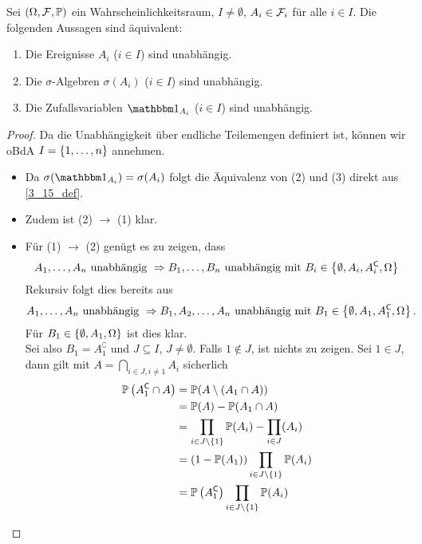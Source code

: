 \begin{lemma}
	\label{3_16_lemma}
	Sei $(\Omega,\mathcal{F},\mathbb{P})$ ein Wahrscheinlichkeitsraum, $I \neq \emptyset$, $A_i \in \mathcal{F}_i$ für alle $i \in I$. 
	Die folgenden Aussagen sind äquivalent:
	\begin{enumerate}[nolistsep]
		\item Die Ereignisse $A_i$ ($i \in I$) sind unabhängig. 
		\item Die $\sigma$-Algebren $\sigma(A_i)$ ($i \in I$) sind unabhängig.
		\item Die Zufallsvariablen $\one_{A_i}$ ($i \in I$) sind unabhängig.
	\end{enumerate}
\end{lemma}
\begin{proof}
	Da die Unabhängigkeit über endliche Teilemengen definiert ist, können wir oBdA $I = \left\{ 1, \dots, n \right\}$ annehmen. 
	\begin{itemize}[leftmargin=*, nolistsep]
		\item Da $\sigma(\one_{A_i}) = \sigma(A_i)$ folgt die Äquivalenz von (2) und (3) direkt aus \cref{3_15_def}.
		\item Zudem ist (2) $\to$ (1) klar.
		\item Für (1) $\to$ (2) genügt es zu zeigen, dass
		\begin{equation*}
			A_1, \dots, A_n \text{ unabhängig } \Rightarrow B_1, \dots, B_n \text{ unabhängig mit } B_i \in \left\{ \emptyset, A_i, A_i^{\mathsf{C}}, \Omega \right\}
		\end{equation*}
		Rekursiv folgt dies bereits aus
		\begin{equation*}
			A_1,\dots, A_n \text{ unabhängig } \Rightarrow B_1, A_2, \dots, A_n \text{ unabhängig mit } B_1 \in \left\{ \emptyset, A_1, A_1^{\mathsf{C}}, \Omega \right\}.
		\end{equation*}
		Für $B_1 \in \left\{ \emptyset, A_1, \Omega \right\}$ ist dies klar.\\
		Sei also $B_1 = A_1^\complement$ und $J \subseteq I$, $J \neq \emptyset$. Falls $1 \notin J$, ist nichts zu zeigen. Sei $1 \in J$, dann gilt mit $A = \bigcap_{i\in J, i \neq 1} A_i$ sicherlich
		\begin{equation*}
			\begin{aligned}
				\mathbb{P}\left( A_1^{\mathsf{C}} \cap A \right) 
				&= \mathbb{P}(A \setminus (A_1 \cap A))\\
				&= \mathbb{P}(A) - \mathbb{P}(A_1 \cap A)\\
				&= \prod_{i\in J \setminus \left\{ 1 \right\}} \mathbb{P}(A_i) - \prod_{i\in J}(A_i) \\
				&= (1- \mathbb{P}(A_1))\prod_{i\in J\setminus \left\{ 1 \right\}} \mathbb{P}(A_i)\\
				&= \mathbb{P}\left( A_1^{\mathsf{C}} \right) \prod_{i\in J \setminus \left\{ 1 \right\}} \mathbb{P}(A_i)
			\end{aligned}
		\end{equation*}
	\end{itemize}
\end{proof}

